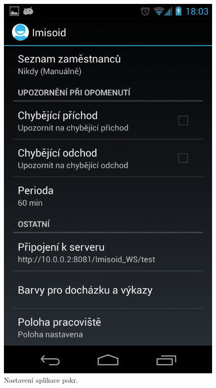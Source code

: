\documentclass{diplomka}
\begin{document}
\begin{figure}[H]
\begin{minipage}{.45\textwidth}
 \includegraphics[width=.9\linewidth]{scr/settings2.png}
   \caption{Nastavení aplikace pokr.}
  \label{fig:settings2}
\end{minipage}
\end{figure}
\end{document}

